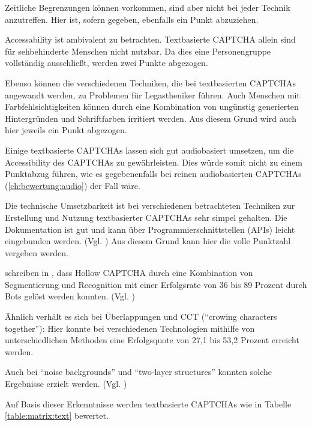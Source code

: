 Zeitliche Begrenzungen können vorkommen, sind aber nicht bei jeder Technik anzutreffen.
Hier ist, sofern gegeben, ebenfalls ein Punkt abzuziehen.

Accessability ist ambivalent zu betrachten.
Textbasierte CAPTCHA allein sind für sehbehinderte Menschen nicht nutzbar. 
Da dies eine Personengruppe vollständig ausschließt, werden zwei Punkte abgezogen.

Ebenso können die verschiedenen Techniken, die bei textbasierten CAPTCHAs angewandt werden, zu Problemen für Legastheniker führen.
Auch Menschen mit Farbfehlsichtigkeiten können durch eine Kombination von ungünstig generierten Hintergründen und Schriftfarben irritiert werden.
Aus diesem Grund wird auch hier jeweils ein Punkt abgezogen.

Einige textbasierte CAPTCHAs lassen sich gut audiobasiert umsetzen, 
um die Accessibility des CAPTCHAs zu gewährleisten. 
Dies würde somit nicht zu einem Punktabzug führen, wie es gegebenenfalls bei reinen audiobasierten CAPTCHAs (\autoref{ch:bewertung:audio}) der Fall wäre.

Die technische Umsetzbarkeit ist bei verschiedenen betrachteten Techniken zur Erstellung und Nutzung textbasierter CAPTCHAs sehr simpel gehalten.
Die Dokumentation ist gut und kann über Programmierschnittstellen (APIs) leicht eingebunden werden. (Vgl. \cite{hcaptcha} \cite{phpcaptcha} \cite{reallysimplecaptcha})
Aus diesem Grund kann hier die volle Punktzahl vergeben werden.

\citeauthor{surveyofresearch} schreiben in , 
dass Hollow CAPTCHA durch eine Kombination von Segmentierung und Recognition %
mit einer Erfolgsrate von 36 bis 89 Prozent durch Bots gelöst werden konnten. (Vgl. \cite[p.76ff]{surveyofresearch}) %

Ähnlich verhält es sich bei Überlappungen und CCT (``crowing characters together''):
Hier konnte bei verschiedenen Technologien mithilfe von unterschiedlichen Methoden
eine Erfolgsquote von 27,1 bis 53,2 Prozent erreicht werden. \cite[p.76]{surveyofresearch} %

Auch bei ``noise backgrounds'' und ``two-layer structures'' konnten solche Ergebnisse erzielt werden. 
(Vgl. \cite[p.76]{surveyofresearch})

Auf Basis dieser Erkenntnisse werden textbasierte CAPTCHAs wie in Tabelle \ref{table:matrix:text} bewertet.



